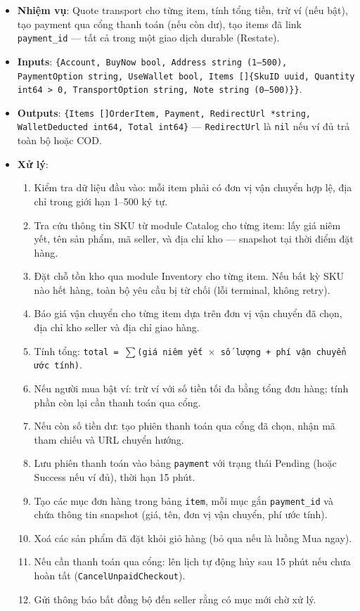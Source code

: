 \begin{itemize}[leftmargin=*]
  \item \textbf{Nhiệm vụ}: Quote transport cho từng item, tính tổng tiền, trừ ví (nếu bật), tạo payment qua cổng thanh toán (nếu còn dư), tạo items đã link \texttt{payment\_id} --- tất cả trong một giao dịch durable (Restate).
  \item \textbf{Inputs}: \texttt{\{Account, BuyNow bool, Address string (1--500), PaymentOption string, UseWallet bool, Items []\{SkuID uuid, Quantity int64 > 0, TransportOption string, Note string (0--500)\}\}}.
  \item \textbf{Outputs}: \texttt{\{Items []OrderItem, Payment, RedirectUrl *string, WalletDeducted int64, Total int64\}} --- \texttt{RedirectUrl} là \texttt{nil} nếu ví đủ trả toàn bộ hoặc COD.
  \item \textbf{Xử lý}:
    \begin{enumerate}
      \item Kiểm tra dữ liệu đầu vào: mỗi item phải có đơn vị vận chuyển hợp lệ, địa chỉ trong giới hạn 1--500 ký tự.
      \item Tra cứu thông tin SKU từ module Catalog cho từng item: lấy giá niêm yết, tên sản phẩm, mã seller, và địa chỉ kho --- snapshot tại thời điểm đặt hàng.
      \item Đặt chỗ tồn kho qua module Inventory cho từng item. Nếu bất kỳ SKU nào hết hàng, toàn bộ yêu cầu bị từ chối (lỗi terminal, không retry).
      \item Báo giá vận chuyển cho từng item dựa trên đơn vị vận chuyển đã chọn, địa chỉ kho seller và địa chỉ giao hàng.
      \item Tính tổng: \texttt{total = $\sum$(giá niêm yết $\times$ số lượng + phí vận chuyển ước tính)}.
      \item Nếu người mua bật ví: trừ ví với số tiền tối đa bằng tổng đơn hàng; tính phần còn lại cần thanh toán qua cổng.
      \item Nếu còn số tiền dư: tạo phiên thanh toán qua cổng đã chọn, nhận mã tham chiếu và URL chuyển hướng.
      \item Lưu phiên thanh toán vào bảng \texttt{payment} với trạng thái Pending (hoặc Success nếu ví đủ), thời hạn 15 phút.
      \item Tạo các mục đơn hàng trong bảng \texttt{item}, mỗi mục gắn \texttt{payment\_id} và chứa thông tin snapshot (giá, tên, đơn vị vận chuyển, phí ước tính).
      \item Xoá các sản phẩm đã đặt khỏi giỏ hàng (bỏ qua nếu là luồng Mua ngay).
      \item Nếu cần thanh toán qua cổng: lên lịch tự động hủy sau 15 phút nếu chưa hoàn tất (\texttt{CancelUnpaidCheckout}).
      \item Gửi thông báo bất đồng bộ đến seller rằng có mục mới chờ xử lý.
    \end{enumerate}
\end{itemize}

